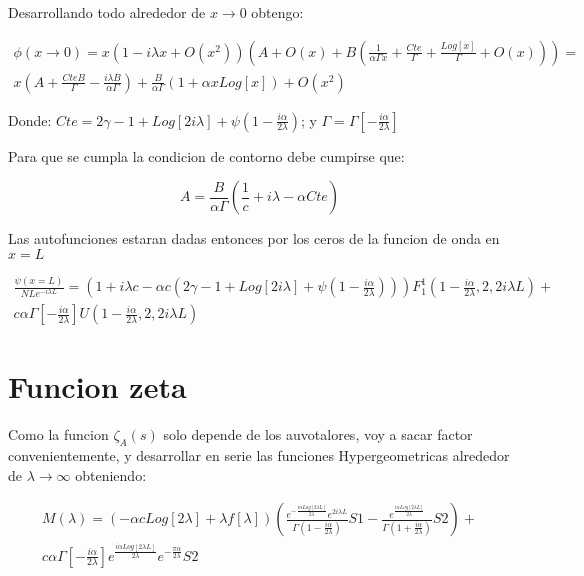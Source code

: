 Desarrollando todo alrededor de $x \rightarrow 0$ obtengo:

\begin{equation}
\begin{array}{c}
\phi (x \rightarrow 0 ) = 
x 
\left(
	1 - i \lambda x + O (x ^2)
	\right)
\left(
	A + O (x) + B \left( \frac{1}{\alpha \Gamma x} + \frac{Cte}{\Gamma} + \frac{Log[x]}{\Gamma} + O(x)\right)	
	\right) = \\
x \left( A + \frac{Cte B}{\Gamma} - \frac{i \lambda B}{\alpha \Gamma}  \right) +
\frac{B}{\alpha	\Gamma} (1 + \alpha x Log[x] ) + O (x^2)
\end{array}
\end{equation}

Donde: $Cte = 2 \gamma -1 + Log[2 i \lambda] + \psi \left( 1 - \frac{i \alpha}{2 \lambda}\right)$; y $\Gamma = \Gamma \left[ - \frac{i \alpha}{2 \lambda} \right]$

Para que se cumpla la condicion de contorno debe cumpirse que:

\begin{equation}
A = \frac{B}{\alpha	\Gamma} 
\left(
\frac{1}{c} + i \lambda - \alpha Cte
\right)
\end{equation}

Las autofunciones estaran dadas entonces por los ceros de la funcion de onda en $x=L$

\begin{equation}
\begin{array}{c}
\frac{\psi (x=L)}{N L e ^{-i \lambda L} }
 = 
\left(
1+ i \lambda c - \alpha c 
\left(
2 \gamma -1 + Log[2 i \lambda] + 
\psi 
( 1 - \frac{i \alpha}{2 \lambda} )
\right)  
\right)
F _1 ^1 (1 - \frac{i \alpha}{2 \lambda},2,2 i \lambda L ) + \\
c \alpha \Gamma [-\frac{i \alpha}{2 \lambda}]
U (1 - \frac{i \alpha}{2 \lambda},2,2 i \lambda L )
\end{array}
\end{equation}

\section{Funcion zeta}

Como la funcion $\zeta _A (s) $ solo depende de los auvotalores, voy a sacar factor convenientemente, y desarrollar en serie las funciones Hypergeometricas alrededor de $\lambda \rightarrow \infty$ obteniendo:

\begin{equation}
\begin{array}{c}
M (\lambda) = 
 (- \alpha c Log[2 \lambda] + \lambda f[ \lambda ] ) 
 \left(
 \frac{e ^{ - \frac{i \alpha Log[2 \lambda L ]}{2 \lambda } } e ^{2 i \lambda L } }
 {\Gamma ( 1 - \frac{i \alpha}{2 \lambda} )} S1 - 
 \frac{e ^{   \frac{i \alpha Log[2 \lambda L ]}{2 \lambda } } }
 	  {\Gamma (1 + \frac{i \alpha}{2 \lambda})} S2 
 \right)  + \\
 c \alpha \Gamma \left[ - \frac{i \alpha}{2 \lambda} \right]
 e ^{ \frac{i \alpha Log[2 \lambda L]}{2 \lambda}} 
 e ^{- \frac{\pi \alpha}{2 \lambda}} 
 S2 
\end{array}
\end{equation}

